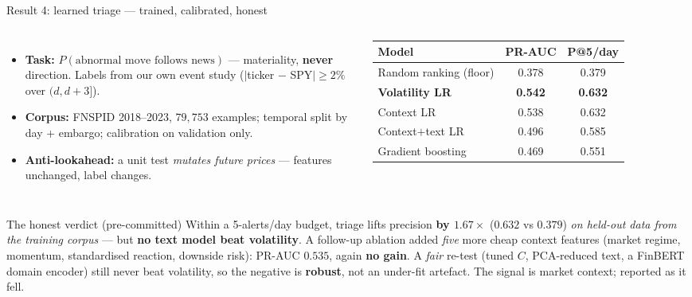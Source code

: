 \documentclass[aspectratio=169]{beamer}
\begin{document}
\begin{frame}{Result 4: learned triage --- trained, calibrated, honest}
\begin{columns}
\begin{itemize}\small
  \item \textbf{Task:} $P(\text{abnormal move follows news})$ --- materiality, \textbf{never} direction. Labels from our own event study ($|$ticker $-$ SPY$| \ge 2\%$ over $(d,d{+}3]$).
  \item \textbf{Corpus:} FNSPID 2018--2023, $79{,}753$ examples; temporal split by day + embargo; calibration on validation only.
  \item \textbf{Anti-lookahead:} a unit test \emph{mutates future prices} --- features unchanged, label changes.
\end{itemize}
\scriptsize
\begin{tabular}{l c c}
\toprule
Model & PR-AUC & P@5/day \\
\midrule
Random ranking (floor) & 0.378 & 0.379 \\
\textbf{Volatility LR} & \textbf{0.542} & \textbf{0.632} \\
Context LR & 0.538 & 0.632 \\
Context$+$text LR & 0.496 & 0.585 \\
Gradient boosting & 0.469 & 0.551 \\
\bottomrule
\end{tabular}
\end{columns}
\vfill
\begin{block}{\small The honest verdict (pre-committed)}
\small Within a 5-alerts/day budget, triage lifts precision \textbf{by $1.67\times$} ($0.632$ vs $0.379$) \emph{on held-out data from the training corpus} --- but \textbf{no text model beat volatility}. A follow-up ablation added \emph{five} more cheap context features (market regime, momentum, standardised reaction, downside risk): PR-AUC $0.535$, again \textbf{no gain}. A \emph{fair} re-test (tuned $C$, PCA-reduced text, a FinBERT domain encoder) still never beat volatility, so the negative is \textbf{robust}, not an under-fit artefact. The signal is market context; reported as it fell.
\end{block}
\end{frame}
\end{document}
